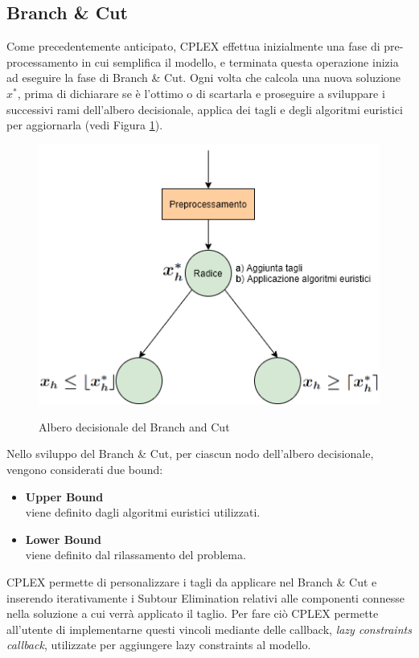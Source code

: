 \subsection{Branch \& Cut}
Come precedentemente anticipato, CPLEX effettua inizialmente una fase di pre-processamento in cui semplifica il modello, e terminata questa operazione inizia ad eseguire la fase di Branch \& Cut. Ogni volta che calcola una nuova soluzione $x^*$, prima di dichiarare se è l'ottimo o di scartarla e proseguire a sviluppare i successivi rami dell'albero decisionale, applica dei tagli e degli algoritmi euristici per aggiornarla (vedi Figura \ref{Albero_decisionale}).
\begin{figure}[h] 
\begin{center} 
  \includegraphics[scale=0.7]{Images/albero_decisionale}\\ 
  \caption{\footnotesize{Albero decisionale del Branch and Cut}}
  \label{Albero_decisionale} 
\end{center} 
\end{figure}
Nello sviluppo del Branch \& Cut, per ciascun nodo dell'albero decisionale, vengono considerati due bound:
\begin{itemize}
\item{\textbf{Upper Bound}\\
viene definito dagli algoritmi euristici utilizzati.
}
\item{\textbf{Lower Bound}\\
viene definito dal rilassamento del problema.
}
\end{itemize}
CPLEX permette di personalizzare i tagli da applicare nel Branch \& Cut e inserendo iterativamente i Subtour Elimination relativi alle componenti connesse nella soluzione a cui verrà applicato il taglio. Per fare ciò CPLEX permette all'utente di implementarne questi vincoli mediante delle callback, \textit{lazy constraints callback}, utilizzate per aggiungere lazy constraints al modello.\\
